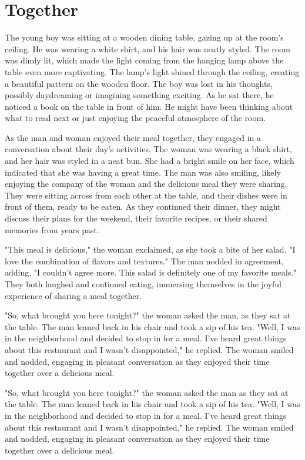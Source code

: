 \documentclass[smalldemyvopaper,11pt,twoside,onecolumn,openright,extrafontsizes]{memoir}
\begin{document}
\chapter{Together}
The young boy was sitting at a wooden dining table, gazing up at the room's ceiling. He was wearing a white shirt, and his hair was neatly styled. The room was dimly lit, which made the light coming from the hanging lamp above the table even more captivating. The lamp's light shined through the ceiling, creating a beautiful pattern on the wooden floor. The boy was lost in his thoughts, possibly daydreaming or imagining something exciting. As he sat there, he noticed a book on the table in front of him. He might have been thinking about what to read next or just enjoying the peaceful atmosphere of the room.\par
As the man and woman enjoyed their meal together, they engaged in a conversation about their day's activities. The woman was wearing a black shirt, and her hair was styled in a neat bun. She had a bright smile on her face, which indicated that she was having a great time. The man was also smiling, likely enjoying the company of the woman and the delicious meal they were sharing. They were sitting across from each other at the table, and their dishes were in front of them, ready to be eaten. As they continued their dinner, they might discuss their plans for the weekend, their favorite recipes, or their shared memories from years past.\par
"This meal is delicious," the woman exclaimed, as she took a bite of her salad. "I love the combination of flavors and textures." The man nodded in agreement, adding, "I couldn't agree more. This salad is definitely one of my favorite meals." They both laughed and continued eating, immersing themselves in the joyful experience of sharing a meal together.\par
"So, what brought you here tonight?" the woman asked the man, as they sat at the table. The man leaned back in his chair and took a sip of his tea. "Well, I was in the neighborhood and decided to stop in for a meal. I've heard great things about this restaurant and I wasn't disappointed," he replied. The woman smiled and nodded, engaging in pleasant conversation as they enjoyed their time together over a delicious meal.\par
"So, what brought you here tonight?" the woman asked the man as they sat at the table. The man leaned back in his chair and took a sip of his tea. "Well, I was in the neighborhood and decided to stop in for a meal. I've heard great things about this restaurant and I wasn't disappointed," he replied. The woman smiled and nodded, engaging in pleasant conversation as they enjoyed their time together over a delicious meal.\par
\end{document}
